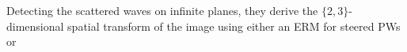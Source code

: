 Detecting
the scattered waves on
infinite planes,
they derive
the $\{ 2, 3 \}$-dimensional spatial  transform of
the image using either
an \acl{ERM} for
steered \acp{PW}
\cite{article:GarciaITUFFC2013} or

